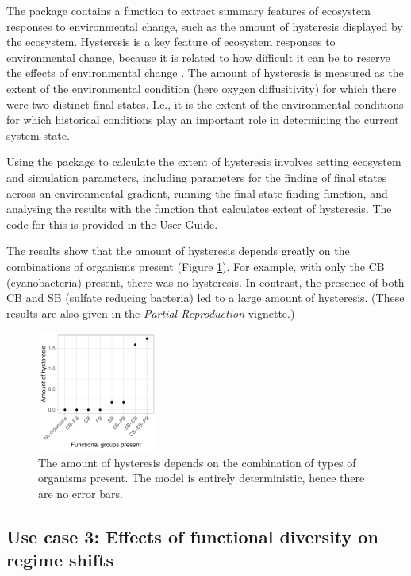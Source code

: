 \documentclass[]{elsarticle} %
\begin{document}
The package contains a function to extract summary features of ecosystem responses to environmental change, such as the amount of hysteresis displayed by the ecosystem. Hysteresis is a key feature of ecosystem responses to environmental change, because it is related to how difficult it can be to reserve the effects of environmental change \citep{Scheffer2001}. The amount of hysteresis is measured as the extent of the environmental condition (here oxygen diffusitivity) for which there were two distinct final states. I.e., it is the extent of the environmental conditions for which historical conditions play an important role in determining the current system state.

Using the package to calculate the extent of hysteresis involves setting ecosystem and simulation parameters, including parameters for the finding of final states across an environmental gradient, running the final state finding function, and analysing the results with the function that calculates extent of hysteresis. The code for this is provided in the \href{https://uzh-peg.r-universe.dev/articles/microxanox/User-guide.html}{User Guide}.

The results show that the amount of hysteresis depends greatly on the combinations of organisms present (Figure \ref{fig:uc2}). For example, with only the CB (cyanobacteria) present, there was no hysteresis. In contrast, the presence of both CB and SB (sulfate reducing bacteria) led to a large amount of hysteresis. (These results are also given in the \emph{Partial Reproduction} vignette.)

\begin{figure}

{\centering \includegraphics[width=150px]{../figures/gen_uc2_user_guide_hysteresis} 

}

\caption{The amount of hysteresis depends on the combination of types of organisms present. The model is entirely deterministic, hence there are no error bars.}\label{fig:uc2}
\end{figure}

\subsection{Use case 3: Effects of functional diversity on regime shifts}\label{use-case-3-effects-of-functional-diversity-on-regime-shifts}
\end{document}
